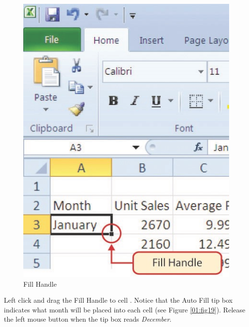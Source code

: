 \begin{figure}[H]
	\centering
	\includegraphics[width=\maxwidth{.95\linewidth}]{gfx/ch01_fig18}
	\caption{Fill Handle}
	\label{01:fig18}
\end{figure}

Left click and drag the Fill Handle to cell . Notice that the Auto Fill tip box indicates what month will be placed into each cell (see Figure \ref{01:fig19}). Release the left mouse button when the tip box reads \textit{December}.

